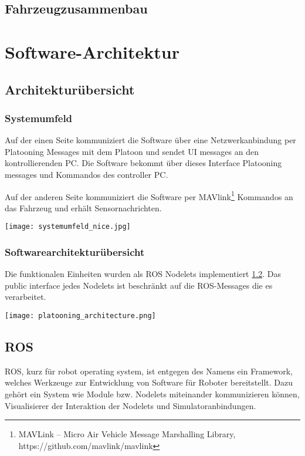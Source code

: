 \documentclass[a4paper, 12pt, titlepage]{scrartcl}
\begin{document}
		\subsection{Fahrzeugzusammenbau} 
		\label{fahrzeugzusammenbau}
	\newpage
	\section{Software-Architektur}
	\label{sw_architektur}
		\subsection{Architekturübersicht} 
		\label{sw_uebersicht}
		\subsubsection*{Systemumfeld}

		Auf der einen Seite kommuniziert die Software über eine Netzwerkanbindung per Platooning Messages mit dem Platoon und sendet UI messages an den kontrollierenden PC. Die Software bekommt über dieses Interface Platooning messages und Kommandos des controller PC. 

		Auf der anderen Seite kommuniziert die Software per MAVlink\footnote{MAVLink -- Micro Air Vehicle Message Marshalling Library, https://github.com/mavlink/mavlink} Kommandos an das Fahrzeug und erhält Sensornachrichten.

 		\texttt{[image: systemumfeld\_nice.jpg]}

 		\subsubsection*{Softwarearchitekturübersicht}

 		Die funktionalen Einheiten wurden als ROS Nodelets implementiert \ref{ros}. Das public interface jedes Nodelets ist beschränkt auf die ROS-Messages die es verarbeitet.

		\newpage
 		\texttt{[image: platooning\_architecture.png]}

		\subsection{ROS}
		\label{ros}
		ROS, kurz für robot operating system, ist entgegen des Namens ein Framework, welches Werkzeuge zur Entwicklung von Software für Roboter bereitstellt. Dazu gehört ein System wie Module bzw. Nodelets miteinander kommunizieren können, Visualisierer der Interaktion der Nodelets und Simulatoranbindungen.\\
\end{document}
